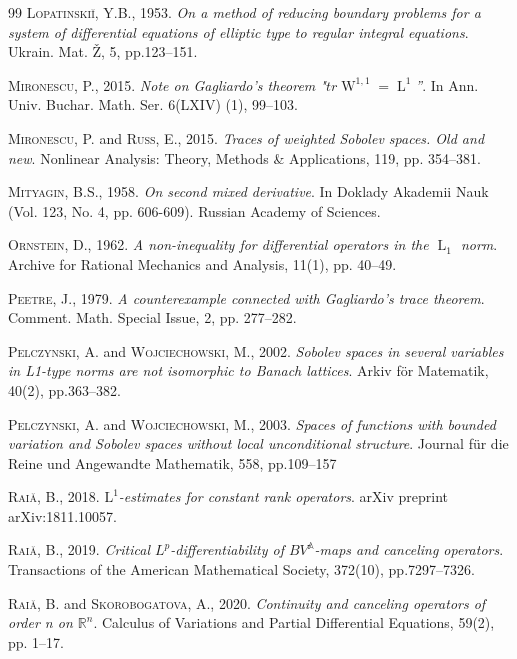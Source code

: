 \documentclass[a4paper,10pt]{amsart}
\newcommand{\lebe}{\operatorname{L}}
\newcommand{\sobo}{\operatorname{W}}
\newcommand{\A}{\mathbb{A}}
\numberwithin{equation}{section}
\theoremstyle{remark}
\numberwithin{equation}{section}
\begin{document}
\begin{thebibliography}{99}
		 \textsc{Lopatinski\u{\i}, Y.B.}, 1953. \emph{On a method of reducing boundary problems for a system
			of differential equations of elliptic type to regular integral equations}. Ukrain. Mat.
		\v{Z}, 5, pp.123--151.
		
		
		 \textsc{Mironescu, P.}, 2015.  \emph{Note on Gagliardo's theorem "\(tr \sobo^{1,1}=\lebe^1\)''}. In 
		Ann. Univ. Buchar. Math. Ser. 6(LXIV) (1), 99--103.
		
		 \textsc{Mironescu, P.} and \textsc{Russ, E.}, 2015. \emph{Traces of weighted Sobolev spaces. Old and new}. Nonlinear
		Analysis: Theory, Methods \& Applications, 119, pp. 354--381.
		
		 \textsc{Mityagin, B.S.}, 1958. \emph{On second mixed derivative}. In Doklady Akademii Nauk (Vol. 123, No. 4, pp. 606-609). Russian Academy of Sciences.
		
		 \textsc{Ornstein, D.}, 1962. \emph{A non-inequality for differential operators in the $\lebe_1$ norm}. Archive for Rational Mechanics and Analysis, 11(1), pp. 40--49.
		
		 \textsc{Peetre, J.}, 1979. \emph{A counterexample connected with Gagliardo's trace theorem}. Comment. Math. Special Issue, 2, pp. 277--282.
		
		 \textsc{Pelczynski, A.} and \textsc{Wojciechowski, M.}, 2002. \emph{Sobolev spaces in several variables in L1-type norms are not isomorphic to Banach lattices}. Arkiv f\"{o}r Matematik, 40(2), pp.363--382.
		
		 \textsc{Pelczynski, A.} and \textsc{Wojciechowski, M.}, 2003. \emph{Spaces of functions with bounded variation and Sobolev spaces without local unconditional structure}. Journal f\"{u}r die Reine und Angewandte Mathematik, 558, pp.109--157
		
		 \textsc{Rai\u{a}, B.}, 2018. \emph{$\mathrm {L}^ 1$-estimates for constant rank operators}. arXiv preprint arXiv:1811.10057.
		
		 \textsc{Rai\u{a}, B.}, 2019. \emph{Critical $L^p$-differentiability of $BV^\A$-maps and canceling operators}. Transactions of the American Mathematical Society, 372(10), pp.7297--7326.
		
		 \textsc{Rai\u{a}, B.} and \textsc{Skorobogatova, A.}, 2020. \emph{Continuity and canceling operators of order n on ${\mathbb {R}}^ n $}. Calculus of Variations and Partial Differential Equations, 59(2), pp. 1--17.
		

\end{thebibliography}
\end{document}
